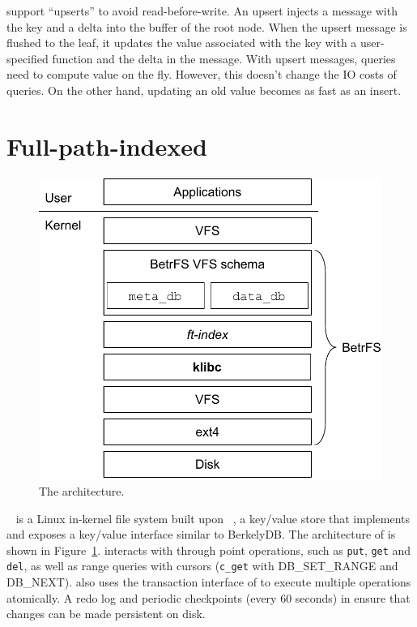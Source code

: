 \bets support ``upserts'' to avoid read-before-write.
An upsert injects a message with the key and a delta into the buffer of the root
node.
When the upsert message is flushed to the leaf, it updates the value associated
with the key with a user-specified function and the delta in the message.
With upsert messages, queries need to compute value on the fly.
However, this doesn't change the IO costs of queries.
On the other hand, updating an old value becomes as fast as an insert.

\section{Full-path-indexed \betrfs}
\label{sec:fpi}

\begin{figure}
    \centering
    \includegraphics{fig/betrfs}
    \caption[The \betrfs architecture]{\label{fig:betrfs}
        The \betrfs architecture.}
\end{figure}

\betrfs~\citep{betrfs1,betrfs1tos} is a Linux in-kernel file
system built upon \fti~\citep{fti}, a key/value store that implements \bets and
exposes a key/value interface similar to BerkelyDB.
The architecture of \betrfs is shown in Figure~\ref{fig:betrfs}.
\betrfs interacts with \fti through point operations, such as \texttt{put},
\texttt{get} and \texttt{del}, as well as range queries with cursors
(\texttt{c\_get} with DB\_SET\_RANGE and DB\_NEXT).
\betrfs also uses the transaction interface of \fti to execute multiple
operations atomically.
A redo log and periodic checkpoints (every 60 seconds) in \fti ensure that
changes can be made persistent on disk.

